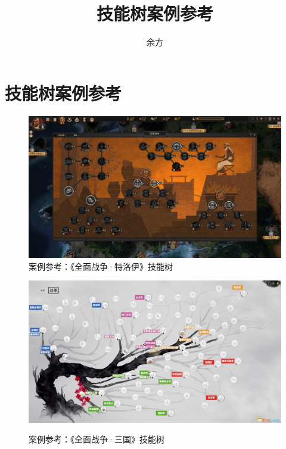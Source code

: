\documentclass{article}  %
\author{余方}
\title{技能树案例参考}
\begin{document}
 
    \maketitle
   \section{技能树案例参考}

\begin{figure}
\centering 
\includegraphics[width=1\textwidth]{TroySkillTree} 
\caption{案例参考：《全面战争·特洛伊》技能树} 
\label{TroySkillTree} 
\end{figure}

\begin{figure}
\centering 
\includegraphics[width=1\textwidth]{ThreeKingdomSkillTree} 
\caption{案例参考：《全面战争·三国》技能树} 
\label{3KingdomSkillTree} 
\cite{3KingdomSkillTree}
\end{figure}
\end{document}
